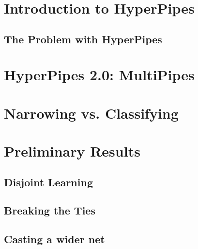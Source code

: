 \documentclass{acm_proc_article-sp}
\begin{document}


\section{Introduction to HyperPipes}









\subsection{The Problem with HyperPipes}



\section{HyperPipes 2.0: MultiPipes}



\section{Narrowing vs. Classifying}



\section{Preliminary Results}

\subsection{Disjoint Learning}



\subsection{Breaking the Ties}





\subsection{Casting a wider net}
\end{document}
